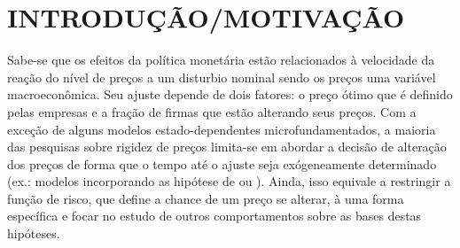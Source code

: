 \documentclass[twoside,a4paper,11pt]{report}
\begin{document}








\tableofcontents

\cleardoublepage

\pagestyle{fancy}


\chapter{INTRODUÇÃO/MOTIVAÇÃO}\label{introen02}

Sabe-se que os efeitos da política monetária estão relacionados à velocidade da reação do nível de preços a um disturbio nominal sendo os preços uma variável macroeconômica. Seu ajuste depende de dois fatores: o preço ótimo que é definido pelas empresas e a fração de firmas que estão alterando seus preços. Com a exceção de alguns modelos estado-dependentes microfundamentados, a maioria das pesquisas sobre rigidez de preços limita-se em abordar a decisão de alteração dos preços de forma que o tempo até o ajuste seja exógeneamente determinado (ex.: modelos incorporando as hipótese de \citet{taylor1980aggregate} ou \citet{calvo1983staggered}). Ainda, isso equivale a restringir a função de risco, que define a chance de um preço se alterar, à uma forma específica e focar no estudo de outros comportamentos sobre as bases destas hipóteses. 
\end{document}
